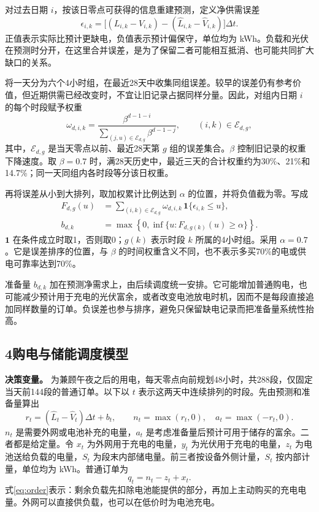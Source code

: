 对过去日期 $i$，按该日零点可获得的信息重建预测，定义净供需误差
\begin{equation}
\epsilon_{i,k}=\big[(L_{i,k}-V_{i,k})-(\widehat L_{i,k}-\widehat V_{i,k})\big]\Delta t.
\label{eq:error}
\end{equation}
正值表示实际比预计更缺电，负值表示预计偏保守，单位均为 kWh。负载和光伏在预测时分开，在这里合并误差，是为了保留二者可能相互抵消、也可能共同扩大缺口的关系。

将一天分为六个4小时组，在最近28天中收集同组误差。较早的误差仍有参考价值，但近期供需已经改变时，不宜让旧记录占据同样分量。因此，对组内日期 $i$ 的每个时段赋予权重
\begin{equation}
\omega_{d,i,k}=\frac{\beta^{d-1-i}}
{\displaystyle\sum_{(j,u)\in\mathcal E_{d,g}}\beta^{d-1-j}},\qquad (i,k)\in\mathcal E_{d,g},
\label{eq:weight}
\end{equation}
其中，$\mathcal E_{d,g}$ 是当天零点以前、最近28天第 $g$ 组的误差集合。$\beta$ 控制旧记录的权重下降速度。取 $\beta=0.7$ 时，满28天历史中，最近三天的合计权重约为30\%、21\%和14.7\%；同一天同组内各时段等分该日权重。

再将误差从小到大排列，取加权累计比例达到 $\alpha$ 的位置，并将负值截为零。写成
\begin{align}
F_{d,g}(u)&=\sum_{(i,k)\in\mathcal E_{d,g}}\omega_{d,i,k}\,\mathbf{1}\{\epsilon_{i,k}\le u\},\\
b_{d,k}&=\max\left\{0,\inf\{u:F_{d,g(k)}(u)\ge\alpha\}\right\}.
\label{eq:margin}
\end{align}
$\mathbf1$ 在条件成立时取1，否则取0；$g(k)$ 表示时段 $k$ 所属的4小时组。采用 $\alpha=0.7$。它是误差排序的位置，与 $\beta$ 的时间权重含义不同，也不表示多买70\%的电或供电可靠率达到70\%。

准备量 $b_{d,k}$ 加在预测净需求上，由后续调度统一安排。它可能增加普通购电，也可能减少预计用于充电的光伏富余，或者改变电池放电时机，因而不是每段直接追加同样数量的订单。负误差也参与排序，避免只保留缺电记录而把准备量系统性抬高。

\subsection*{4\quad 购电与储能调度模型}

\textbf{决策变量。} 为兼顾午夜之后的用电，每天零点向前规划48小时，共288段，仅固定当天前144段的普通订单。以下以 $t$ 表示这两天中连续排列的时段。先由预测和准备量算出
\begin{equation}
r_t=(\widehat L_t-\widehat V_t)\Delta t+b_t,\qquad
n_t=\max(r_t,0),\quad a_t=\max(-r_t,0).
\end{equation}
$n_t$ 是需要外网或电池补充的电量，$a_t$ 是考虑准备量后预计可用于储存的富余。二者都是给定量。令 $x_t$ 为外网用于充电的电量，$y_t$ 为光伏用于充电的电量，$z_t$ 为电池送给负载的电量，$S_t$ 为段末内部储电量。前三者按设备外侧计量，$S_t$ 按内部计量，单位均为 kWh。普通订单为
\begin{equation}
q_t=n_t-z_t+x_t.
\label{eq:order}
\end{equation}
式\eqref{eq:order}表示：剩余负载先扣除电池能提供的部分，再加上主动购买的充电电量。外网可以直接供负载，也可以在低价时为电池充电。

